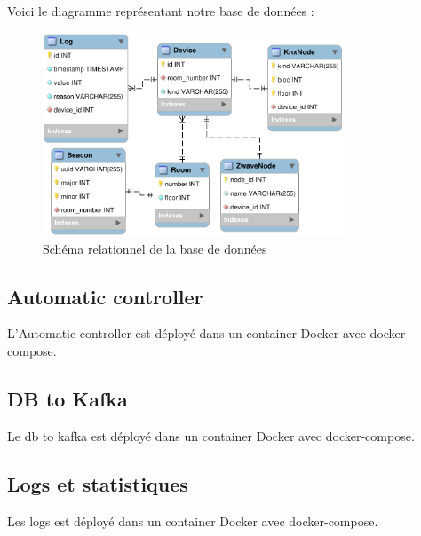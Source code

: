 Voici le diagramme représentant notre base de données :
\begin{figure}
    \begin{center}
        \includegraphics[width=0.8\textwidth]{img/mysql-shema.png}
    \end{center}
    \caption{Schéma relationnel de la base de données}
    \label{db_schema}
\end{figure}

\subsection{Automatic controller}
L'Automatic controller est déployé dans un container Docker avec docker-compose.
\subsection{DB to Kafka}
Le db to kafka est déployé dans un container Docker avec docker-compose.
\subsection{Logs et statistiques}
Les logs est déployé dans un container Docker avec docker-compose.
